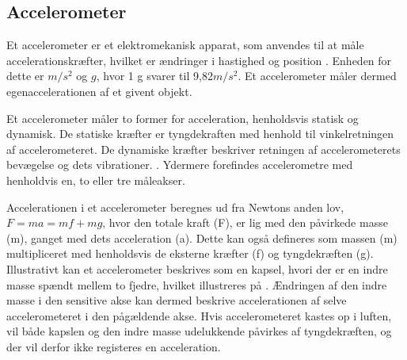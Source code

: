 \subsection{Accelerometer}
Et accelerometer er et elektromekanisk apparat, som anvendes til at måle accelerationskræfter, hvilket er ændringer i hastighed og position \citep{Goodrich2013,TittertonWeston2004}. Enheden for dette er $m/s^2$ og $g$, hvor 1 g svarer til 9,82$m/s^2$. Et accelerometer måler dermed egenaccelerationen af et givent objekt. \citep{Sparkfun,TittertonWeston2004} \newline

Et accelerometer måler to former for acceleration, henholdsvis statisk og dynamisk. De statiske kræfter er tyngdekraften med henhold til vinkelretningen af accelerometeret. De dynamiske kræfter beskriver retningen af accelerometerets bevægelse og dets vibrationer. \citep{Sparkfun,Goodrich2013,Engineering}. Ydermere forefindes accelerometre med henholdvis en, to eller tre måleakser.  \citep{TittertonWeston2004} 

Accelerationen i et accelerometer beregnes ud fra Newtons anden lov, $F=ma=mf+mg$, hvor den totale kraft (F), er lig med den påvirkede masse (m), ganget med dets acceleration (a). Dette kan også defineres som massen (m) multipliceret med henholdsvis de eksterne kræfter (f) og tyngdekræften (g). \citep{TittertonWeston2004,Academic2016d} \newline
Illustrativt kan et accelerometer beskrives som en kapsel, hvori der er en indre masse spændt mellem to fjedre, hvilket illustreres på . Ændringen af den indre masse i den sensitive akse kan dermed beskrive accelerationen af selve accelerometeret i den pågældende akse. Hvis accelerometeret kastes op i luften, vil både kapslen og den indre masse udelukkende påvirkes af tyngdekræften, og der vil derfor ikke registeres en acceleration.\citep{TittertonWeston2004,Academic2016d} \newline

